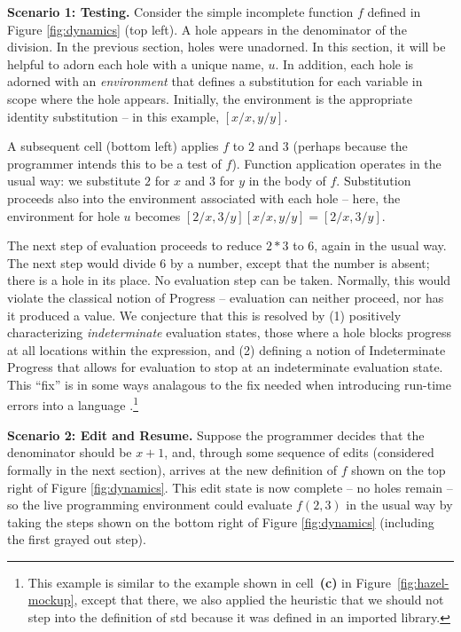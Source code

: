 \noindent\textbf{Scenario 1: Testing.} Consider the simple incomplete function $f$ defined in Figure \ref{fig:dynamics} (top left).  
%
A hole appears in the denominator of the division. In the previous section,
holes were unadorned. In this section, it will be helpful to adorn each hole with a unique name, $u$. In addition, each hole is adorned with an \emph{environment} that defines a substitution for each variable in scope
where the hole appears. Initially, the environment is the appropriate identity substitution -- in this example, $[x/x, y/y]$. 

A subsequent cell (bottom left) applies $f$ to $2$ and $3$ (perhaps because the programmer intends this to be a test of $f$). Function application operates in the usual way: 
we substitute $2$ for $x$ and $3$ for $y$ in the body of $f$. Substitution proceeds also into the environment associated with each hole -- here, the environment for hole $u$ becomes $[2/x, 3/y][x/x, y/y] = [2/x, 3/y]$.

The next step of evaluation proceeds to reduce $2 * 3$ to $6$, again in the usual way.
%
The next step would divide $6$ by a number, except that the number is
absent; there is a hole in its place. No evaluation step can be taken. 
%
Normally, this would violate the classical notion of Progress -- 
evaluation can neither proceed, nor has it produced a value. We conjecture that this is
resolved by (1) positively characterizing \emph{indeterminate} 
evaluation states, those where a hole blocks progress at all locations
within the expression, and (2) defining
a notion of Indeterminate Progress that allows for evaluation to stop at an 
indeterminate evaluation state. This ``fix'' is in some ways analagous to the fix needed when introducing 
run-time errors into a language \cite{pfpl}.\footnote{%
This example is similar to the example shown in cell~\textbf{(c)} in
Figure~\ref{fig:hazel-mockup}, except that there, we also applied
the heuristic that we should not step
into the definition of {std} because it was defined in an imported library.}

\vspace{0.25ex}
\noindent\textbf{Scenario 2: Edit and Resume.}
Suppose the programmer decides that the denominator should
be $x+1$, and, through some sequence of edits (considered formally in the next section), arrives at 
the new definition of $f$ shown on the top right of Figure \ref{fig:dynamics}. This edit state is now complete -- no holes remain -- so the live programming environment 
could evaluate $f(2, 3)$ in the usual way by taking the steps shown on
the bottom right of Figure \ref{fig:dynamics} (including the first
grayed out step).

